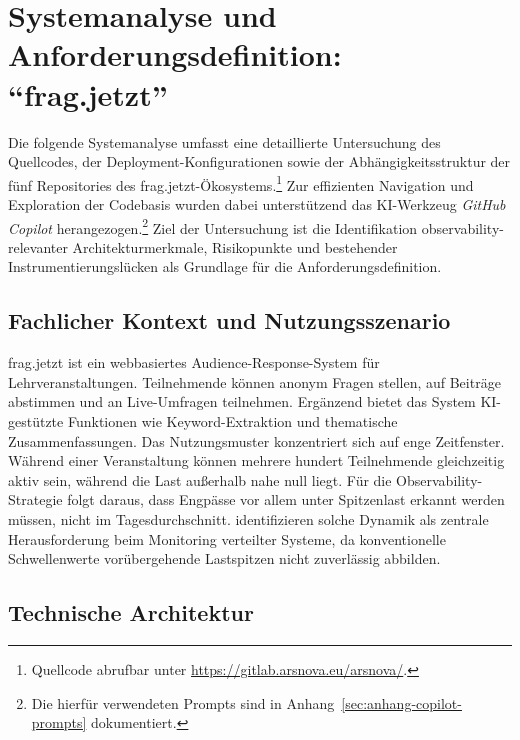 
\chapter{Systemanalyse und Anforderungsdefinition: \enquote{frag.jetzt}}

Die folgende Systemanalyse umfasst eine detaillierte Untersuchung des Quellcodes, der Deployment-Konfigurationen sowie der Abhängigkeitsstruktur der fünf Repositories des frag.jetzt-Ökosystems.\footnote{Quellcode abrufbar unter \url{https://gitlab.arsnova.eu/arsnova/}.}\nocite{fragjetztRepo}\nocite{prometheuscAdvisorDocs}\nocite{grafanaDocs} Zur effizienten Navigation und Exploration der Codebasis wurden dabei unterstützend das KI-Werkzeug \emph{GitHub Copilot} herangezogen.\footnote{Die hierfür verwendeten Prompts sind in Anhang~\ref{sec:anhang-copilot-prompts} dokumentiert.} Ziel der Untersuchung ist die Identifikation observability-relevanter Architekturmerkmale, Risikopunkte und bestehender Instrumentierungslücken als Grundlage für die Anforderungsdefinition.


\section{Fachlicher Kontext und Nutzungsszenario}

frag.jetzt ist ein webbasiertes Audience-Response-System für Lehrveranstaltungen. Teilnehmende können anonym Fragen stellen, auf Beiträge abstimmen und an Live-Umfragen teilnehmen. Ergänzend bietet das System KI-gestützte Funktionen wie Keyword-Extraktion und thematische Zusammenfassungen. Das Nutzungsmuster konzentriert sich auf enge Zeitfenster. Während einer Veranstaltung können mehrere hundert Teilnehmende gleichzeitig aktiv sein, während die Last außerhalb nahe null liegt. Für die Observability-Strategie folgt daraus, dass Engpässe vor allem unter Spitzenlast erkannt werden müssen, nicht im Tagesdurchschnitt. \textcite[S.~8]{Niedermaier2019onObservability} identifizieren solche Dynamik als zentrale Herausforderung beim Monitoring verteilter Systeme, da konventionelle Schwellenwerte vorübergehende Lastspitzen nicht zuverlässig abbilden.


\section{Technische Architektur}

